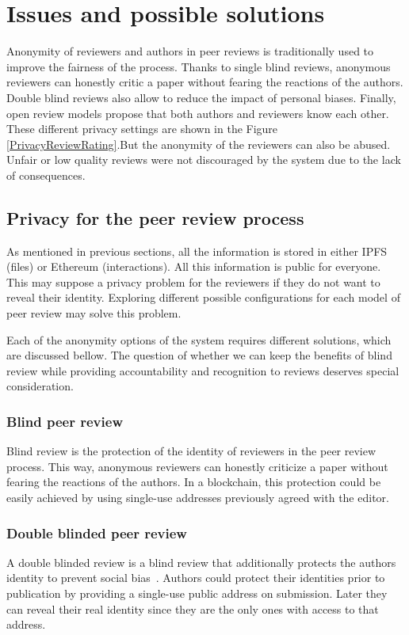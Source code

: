 \section{Issues and possible solutions}
\label{sec:privacyReview}


Anonymity of reviewers and authors in peer reviews is traditionally used to
improve the fairness of the process. Thanks to single blind reviews, anonymous
reviewers can honestly critic a paper without fearing the reactions of the
authors. Double blind reviews also allow to reduce the impact of personal
biases. Finally, open review models propose that both authors and reviewers know
each other. These different privacy settings are shown in the Figure
\ref{PrivacyReviewRating}.But the anonymity of the reviewers can also be abused.
Unfair or low quality reviews were not discouraged by the system due to the lack
of consequences.

\subsection{Privacy for the peer review process}

As mentioned in previous sections, all the information is stored in either IPFS
(files) or Ethereum (interactions). All this information is public for everyone.
This may suppose a privacy problem for the reviewers if they do not want to
reveal their identity. Exploring different possible configurations for each model of
peer review may solve this problem.

Each of the anonymity options of the system requires different solutions, which
are discussed bellow. The question of whether we can keep the benefits of blind
review while providing accountability and recognition to reviews deserves
special consideration.

\subsubsection*{Blind peer review}
Blind review is the protection of the identity of reviewers in the peer review
process. This way, anonymous reviewers can honestly criticize a paper without
fearing the reactions of the authors. In a blockchain, this protection could be
easily achieved by using single-use addresses previously agreed with the editor.

\subsubsection*{Double blinded peer review}
A double blinded review is a blind review that additionally protects the authors
identity to prevent social bias~\cite{lee2013bias,budden2008double}. Authors
could protect their identities prior to publication by providing a single-use
public address on submission. Later they can reveal their real identity since
they are the only ones with access to that address.

